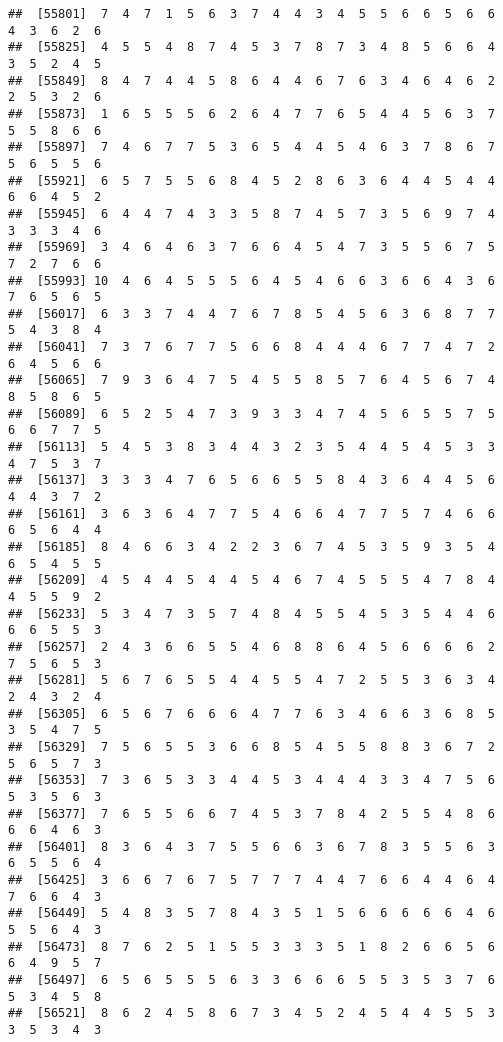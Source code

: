\documentclass[
]{book}
\begin{document}
\begin{verbatim}
##  [55801]  7  4  7  1  5  6  3  7  4  4  3  4  5  5  6  6  5  6  6  4  3  6  2  6
##  [55825]  4  5  5  4  8  7  4  5  3  7  8  7  3  4  8  5  6  6  4  3  5  2  4  5
##  [55849]  8  4  7  4  4  5  8  6  4  4  6  7  6  3  4  6  4  6  2  2  5  3  2  6
##  [55873]  1  6  5  5  5  6  2  6  4  7  7  6  5  4  4  5  6  3  7  5  5  8  6  6
##  [55897]  7  4  6  7  7  5  3  6  5  4  4  5  4  6  3  7  8  6  7  5  6  5  5  6
##  [55921]  6  5  7  5  5  6  8  4  5  2  8  6  3  6  4  4  5  4  4  6  6  4  5  2
##  [55945]  6  4  4  7  4  3  3  5  8  7  4  5  7  3  5  6  9  7  4  3  3  3  4  6
##  [55969]  3  4  6  4  6  3  7  6  6  4  5  4  7  3  5  5  6  7  5  7  2  7  6  6
##  [55993] 10  4  6  4  5  5  5  6  4  5  4  6  6  3  6  6  4  3  6  7  6  5  6  5
##  [56017]  6  3  3  7  4  4  7  6  7  8  5  4  5  6  3  6  8  7  7  5  4  3  8  4
##  [56041]  7  3  7  6  7  7  5  6  6  8  4  4  4  6  7  7  4  7  2  6  4  5  6  6
##  [56065]  7  9  3  6  4  7  5  4  5  5  8  5  7  6  4  5  6  7  4  8  5  8  6  5
##  [56089]  6  5  2  5  4  7  3  9  3  3  4  7  4  5  6  5  5  7  5  6  6  7  7  5
##  [56113]  5  4  5  3  8  3  4  4  3  2  3  5  4  4  5  4  5  3  3  4  7  5  3  7
##  [56137]  3  3  3  4  7  6  5  6  6  5  5  8  4  3  6  4  4  5  6  4  4  3  7  2
##  [56161]  3  6  3  6  4  7  7  5  4  6  6  4  7  7  5  7  4  6  6  6  5  6  4  4
##  [56185]  8  4  6  6  3  4  2  2  3  6  7  4  5  3  5  9  3  5  4  6  5  4  5  5
##  [56209]  4  5  4  4  5  4  4  5  4  6  7  4  5  5  5  4  7  8  4  4  5  5  9  2
##  [56233]  5  3  4  7  3  5  7  4  8  4  5  5  4  5  3  5  4  4  6  6  6  5  5  3
##  [56257]  2  4  3  6  6  5  5  4  6  8  8  6  4  5  6  6  6  6  2  7  5  6  5  3
##  [56281]  5  6  7  6  5  5  4  4  5  5  4  7  2  5  5  3  6  3  4  2  4  3  2  4
##  [56305]  6  5  6  7  6  6  6  4  7  7  6  3  4  6  6  3  6  8  5  3  5  4  7  5
##  [56329]  7  5  6  5  5  3  6  6  8  5  4  5  5  8  8  3  6  7  2  5  6  5  7  3
##  [56353]  7  3  6  5  3  3  4  4  5  3  4  4  4  3  3  4  7  5  6  5  3  5  6  3
##  [56377]  7  6  5  5  6  6  7  4  5  3  7  8  4  2  5  5  4  8  6  6  6  4  6  3
##  [56401]  8  3  6  4  3  7  5  5  6  6  3  6  7  8  3  5  5  6  3  6  5  5  6  4
##  [56425]  3  6  6  7  6  7  5  7  7  7  4  4  7  6  6  4  4  6  4  7  6  6  4  3
##  [56449]  5  4  8  3  5  7  8  4  3  5  1  5  6  6  6  6  6  4  6  5  5  6  4  3
##  [56473]  8  7  6  2  5  1  5  5  3  3  3  5  1  8  2  6  6  5  6  6  4  9  5  7
##  [56497]  6  5  6  5  5  5  6  3  3  6  6  6  5  5  3  5  3  7  6  5  3  4  5  8
##  [56521]  8  6  2  4  5  8  6  7  3  4  5  2  4  5  4  4  5  5  3  3  5  3  4  3

\end{verbatim}
\end{document}
